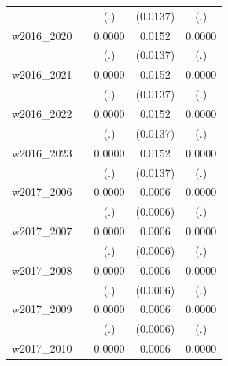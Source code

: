 \begin{table}[htbp]
\begin{tabular}{l*{4}{c}}
            &                     &         (.)         &    (0.0137)         &         (.)         \\
[1em]
w2016\_2020  &                     &      0.0000         &      0.0152         &      0.0000         \\
            &                     &         (.)         &    (0.0137)         &         (.)         \\
[1em]
w2016\_2021  &                     &      0.0000         &      0.0152         &      0.0000         \\
            &                     &         (.)         &    (0.0137)         &         (.)         \\
[1em]
w2016\_2022  &                     &      0.0000         &      0.0152         &      0.0000         \\
            &                     &         (.)         &    (0.0137)         &         (.)         \\
[1em]
w2016\_2023  &                     &      0.0000         &      0.0152         &      0.0000         \\
            &                     &         (.)         &    (0.0137)         &         (.)         \\
[1em]
w2017\_2006  &                     &      0.0000         &      0.0006         &      0.0000         \\
            &                     &         (.)         &    (0.0006)         &         (.)         \\
[1em]
w2017\_2007  &                     &      0.0000         &      0.0006         &      0.0000         \\
            &                     &         (.)         &    (0.0006)         &         (.)         \\
[1em]
w2017\_2008  &                     &      0.0000         &      0.0006         &      0.0000         \\
            &                     &         (.)         &    (0.0006)         &         (.)         \\
[1em]
w2017\_2009  &                     &      0.0000         &      0.0006         &      0.0000         \\
            &                     &         (.)         &    (0.0006)         &         (.)         \\
[1em]
w2017\_2010  &                     &      0.0000         &      0.0006         &      0.0000         \\

\end{tabular}
\end{table}
